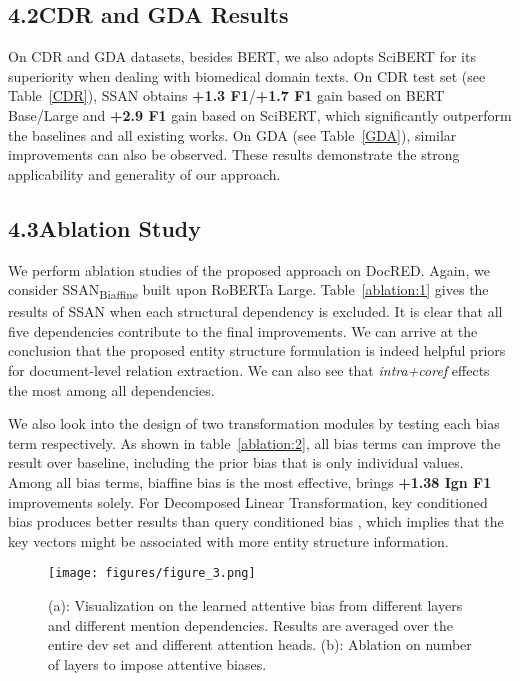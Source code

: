 \documentclass[letterpaper]{article} \usepackage{aaai21}  \usepackage{times}  \usepackage{helvet} \usepackage{courier}  \usepackage[hyphens]{url}  \usepackage{graphicx} \usepackage{booktabs}
\begin{document}
\subsection{4.2\quad CDR and GDA Results}
On CDR and GDA datasets, besides BERT, we also adopts SciBERT for its superiority when dealing with biomedical domain texts.
On CDR test set (see Table~\ref{CDR}), SSAN obtains \textbf{+1.3 F1}/\textbf{+1.7 F1} gain based on BERT Base/Large and \textbf{+2.9 F1} gain based on SciBERT, which significantly outperform the baselines and all existing works.
On GDA (see Table~\ref{GDA}), similar improvements can also be observed.
These results demonstrate the strong applicability and generality of our approach.


\subsection{4.3\quad Ablation Study}
We perform ablation studies of the proposed approach on DocRED. Again, we consider SSAN\textsubscript{Biaffine} built upon RoBERTa Large.
Table~\ref{ablation:1} gives the results of SSAN when each structural dependency is excluded.
It is clear that all five dependencies contribute to the final improvements.
We can arrive at the conclusion that the proposed entity structure formulation is indeed helpful priors for document-level relation extraction.
We can also see that \textit{intra+coref} effects the most among all dependencies.

We also look into the design of two transformation modules by testing each bias term respectively.
As shown in table~\ref{ablation:2}, all bias terms can improve the result over baseline, including the prior bias  that is only individual values.
Among all bias terms, biaffine bias  is the most effective, brings \textbf{+1.38 Ign F1} improvements solely.
For Decomposed Linear Transformation, key conditioned bias  produces better results than query conditioned bias , which implies that the key vectors might  be associated with more entity structure information.


\begin{figure*}[t!]
\centering
\texttt{[image: figures/figure\_3.png]}
\caption{(a): Visualization on the learned attentive bias from different layers and different mention dependencies. Results are averaged over the entire dev set and different attention heads. (b): Ablation on number of layers to impose attentive biases.}
\label{figure:3}
\end{figure*}
\end{document}

